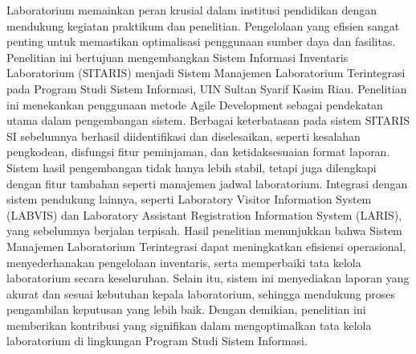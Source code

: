 \noindent
\fontsize{10pt}{12pt}\selectfont
Laboratorium memainkan peran krusial dalam institusi pendidikan dengan mendukung kegiatan praktikum dan penelitian. Pengelolaan yang efisien sangat penting untuk memastikan optimalisasi penggunaan sumber daya dan fasilitas. Penelitian ini bertujuan mengembangkan Sistem Informasi Inventaris Laboratorium (SITARIS) menjadi Sistem Manajemen Laboratorium Terintegrasi pada Program Studi Sistem Informasi, UIN Sultan Syarif Kasim Riau. Penelitian ini menekankan penggunaan metode Agile Development sebagai pendekatan utama dalam pengembangan sistem. Berbagai keterbatasan pada sistem SITARIS SI sebelumnya berhasil diidentifikasi dan diselesaikan, seperti kesalahan pengkodean, disfungsi fitur peminjaman, dan ketidaksesuaian format laporan. Sistem hasil pengembangan tidak hanya lebih stabil, tetapi juga dilengkapi dengan fitur tambahan seperti manajemen jadwal laboratorium. Integrasi dengan sistem pendukung lainnya, seperti Laboratory Visitor Information System (LABVIS) dan Laboratory Assistant Registration Information System (LARIS), yang sebelumnya berjalan terpisah. Hasil penelitian menunjukkan bahwa Sistem Manajemen Laboratorium Terintegrasi dapat meningkatkan efisiensi operasional, menyederhanakan pengelolaan inventaris, serta memperbaiki tata kelola laboratorium secara keseluruhan. Selain itu, sistem ini menyediakan laporan yang akurat dan sesuai kebutuhan kepala laboratorium, sehingga mendukung proses pengambilan keputusan yang lebih baik. Dengan demikian, penelitian ini memberikan kontribusi yang signifikan dalam mengoptimalkan tata kelola laboratorium di lingkungan Program Studi Sistem Informasi.\\
 \\
